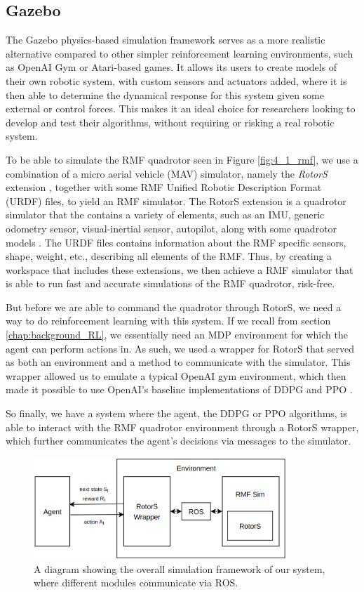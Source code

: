 \subsection{Gazebo}

The Gazebo \cite{Gazebo} physics-based simulation framework serves as a more realistic alternative compared to other simpler reinforcement learning environments, such as OpenAI Gym or Atari-based games. It allows its users to create models of their own robotic system, with custom sensors and actuators added, where it is then able to determine the dynamical response for this system given some external or control forces. This makes it an ideal choice for researchers looking to develop and test their algorithms, without requiring or risking a real robotic system.

To be able to simulate the RMF quadrotor seen in Figure \ref{fig:4_1_rmf}, we use a combination of a micro aerial vehicle (MAV) simulator, namely the \textit{RotorS} extension \cite{RotorS_Furrer2016}, together with some RMF Unified Robotic Description Format (URDF) files, to yield an RMF simulator.
The RotorS extension is a quadrotor simulator that the contains a variety of elements, such as an IMU, generic odometry sensor, visual-inertial sensor, autopilot, along with some quadrotor models \cite{RotorS_Furrer2016}.
The URDF files contains information about the RMF specific sensors, shape, weight, etc., describing all elements of the RMF.
Thus, by creating a workspace that includes these extensions, we then achieve a RMF simulator that is able to run fast and accurate simulations of the RMF quadrotor, risk-free.

But before we are able to command the quadrotor through RotorS, we need a way to do reinforcement learning with this system. If we recall from section \ref{chap:background_RL}, we essentially need an MDP environment for which the agent can perform actions in. As such, we used a wrapper for RotorS that served as both an environment and a method to communicate with the simulator. 
This wrapper allowed us to emulate a typical OpenAI gym environment, which then made it possible to use OpenAI's baseline implementations of DDPG and PPO \cite{baselines}.

So finally, we have a system where the agent, the DDPG or PPO algorithms, is able to interact with the RMF quadrotor environment through a RotorS wrapper, which further communicates the agent's decisions via messages to the simulator.
\begin{figure}[htb]
    \centering
    \includegraphics[width=0.85\textwidth]{figures/4_/4_1_simFramew.png}
    \caption{A diagram showing the overall simulation framework of our system, where different modules communicate via ROS.}
    \label{fig:4_1_simFramework}
\end{figure}


